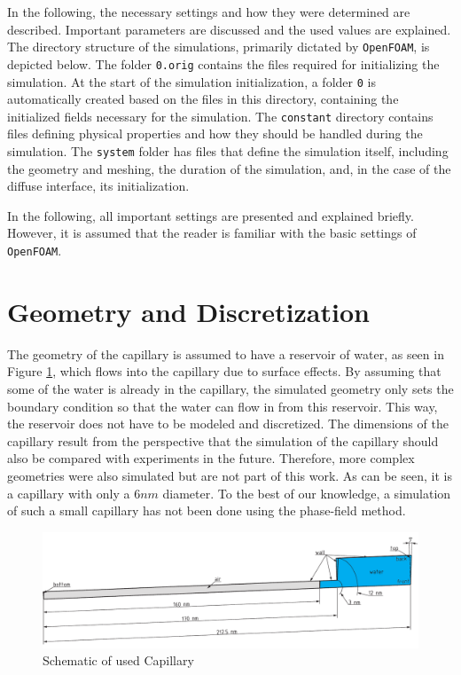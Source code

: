 In the following, the necessary settings and how they were determined are described. Important parameters are discussed and the used values are explained. The directory structure of the simulations, primarily dictated by \texttt{OpenFOAM}, is depicted below. The folder \texttt{0.orig} contains the files required for initializing the simulation. At the start of the simulation initialization, a folder \texttt{0} is automatically created based on the files in this directory, containing the initialized fields necessary for the simulation. The \texttt{constant} directory contains files defining physical properties and how they should be handled during the simulation. The \texttt{system} folder has files that define the simulation itself, including the geometry and meshing, the duration of the simulation, and, in the case of the diffuse interface, its initialization.

In the following, all important settings are presented and explained briefly. However, it is assumed that the reader is familiar with the basic settings of \texttt{OpenFOAM}.

\section{Geometry and Discretization}

The geometry of the capillary is assumed to have a reservoir of water, as seen in Figure \ref{fig: Capillary Geometry}, which flows into the capillary due to surface effects. By assuming that some of the water is already in the capillary, the simulated geometry only sets the boundary condition so that the water can flow in from this reservoir. This way, the reservoir does not have to be modeled and discretized. The dimensions of the capillary result from the perspective that the simulation of the capillary should also be compared with experiments in the future. Therefore, more complex geometries were also simulated but are not part of this work. As can be seen, it is a capillary with only a $6nm$ diameter. To the best of our knowledge, a simulation of such a small capillary has not been done using the phase-field method.

\begin{figure}[h]
\centering
\includegraphics[width=.95\textwidth]{Pictures/Cap_5DEG.pdf}
\caption{Schematic of used Capillary}
\label{fig: Capillary Geometry}
\end{figure}

